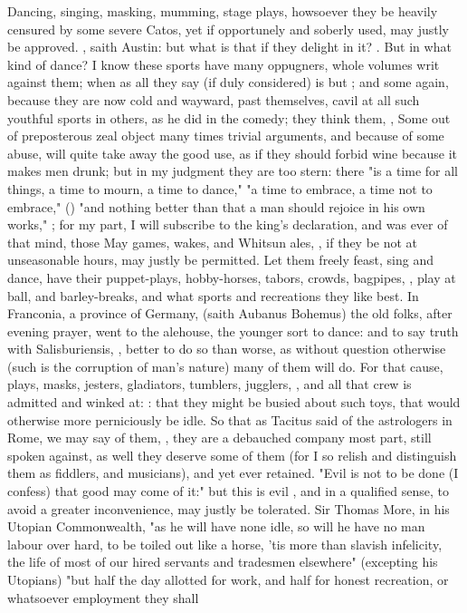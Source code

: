 {Dancing, singing, masking, mumming, stage plays, howsoever they be heavily censured by some severe Catos, yet if opportunely and soberly used, may justly be approved. , saith Austin: but what is that if they delight in it? . But in what kind of dance? I know these sports have many oppugners, whole volumes writ against them; when as all they say (if duly considered) is but ; and some again, because they are now cold and wayward, past themselves, cavil at all such youthful sports in others, as he did in the comedy; they think them, , \etc{} Some out of preposterous zeal object many times trivial arguments, and because of some abuse, will quite take away the good use, as if they should forbid wine because it makes men drunk; but in my judgment they are too stern: there "is a time for all things, a time to mourn, a time to dance,"  "a time to embrace, a time not to embrace," () "and nothing better than that a man should rejoice in his own works," ; for my part, I will subscribe to the king's declaration, and was ever of that mind, those May games, wakes, and Whitsun ales, \etc{}, if they be not at unseasonable hours, may justly be permitted. Let them freely feast, sing and dance, have their puppet-plays, hobby-horses, tabors, crowds, bagpipes, \etc{}, play at ball, and barley-breaks, and what sports and recreations they like best. In Franconia, a province of Germany, (saith Aubanus Bohemus) the old folks, after evening prayer, went to the alehouse, the younger sort to dance: and to say truth with Salisburiensis, , better to do so than worse, as without question otherwise (such is the corruption of man's nature) many of them will do. For that cause, plays, masks, jesters, gladiators, tumblers, jugglers, \etc{}, and all that crew is admitted and winked at: : that they might be busied about such toys, that would otherwise more perniciously be idle. So that as Tacitus said of the astrologers in Rome, we may say of them, , they are a debauched company most part, still spoken against, as well they deserve some of them (for I so relish and distinguish them as fiddlers, and musicians), and yet ever retained. "Evil is not to be done (I confess) that good may come of it:" but this is evil , and in a qualified sense, to avoid a greater inconvenience, may justly be tolerated. Sir Thomas More, in his Utopian Commonwealth, "as he will have none idle, so will he have no man labour over hard, to be toiled out like a horse, 'tis more than slavish infelicity, the life of most of our hired servants and tradesmen elsewhere" (excepting his Utopians) "but half the day allotted for work, and half for honest recreation, or whatsoever employment they shall }
